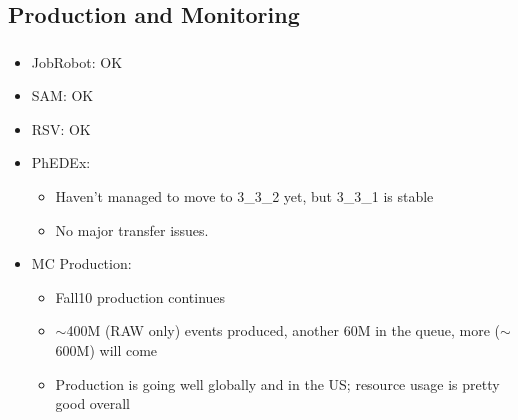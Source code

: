 \documentclass{beamer}
\newcommand{\ca}{\ensuremath{\sim}}
\begin{document}
\subsection{Production and Monitoring}
\begin{frame}
\frametitle{}

\begin{itemize}
    \item JobRobot: OK
    \item SAM: OK
    \item RSV: OK
    \item PhEDEx:
    \begin{itemize}
			\item Haven't managed to move to 3\_3\_2 yet, but 3\_3\_1 is stable
			\item No major transfer issues.
    \end{itemize}
    \item MC Production:
    \begin{itemize}
			\item Fall10 production continues
			\item \ca{}400M (RAW only) events produced, another 60M in the queue, more (\ca{}600M) will come
			\item Production is going well globally and in the US; resource usage is pretty good overall
    \end{itemize}
\end{itemize}
\end{frame}
\end{document}
